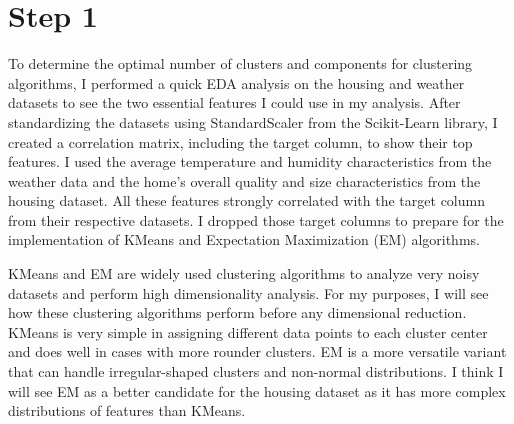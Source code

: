 \documentclass[conference]{IEEEtran}
\begin{document}
\section{Step 1}
\par To determine the optimal number of clusters and components for clustering algorithms, I performed a quick EDA analysis on the housing and weather datasets to see the two essential features I could use in my analysis. After standardizing the datasets using StandardScaler from the Scikit-Learn library, I created a correlation matrix, including the target column, to show their top features. I used the average temperature and humidity characteristics from the weather data and the home's overall quality and size characteristics from the housing dataset. All these features strongly correlated with the target column from their respective datasets. I dropped those target columns to prepare for the implementation of KMeans and Expectation Maximization (EM) algorithms.
\par KMeans and EM are widely used clustering algorithms to analyze very noisy datasets and perform high dimensionality analysis. For my purposes, I will see how these clustering algorithms perform before any dimensional reduction. KMeans is very simple in assigning different data points to each cluster center and does well in cases with more rounder clusters. EM is a more versatile variant that can handle irregular-shaped clusters and non-normal distributions. I think I will see EM as a better candidate for the housing dataset as it has more complex distributions of features than KMeans.
\end{document}
